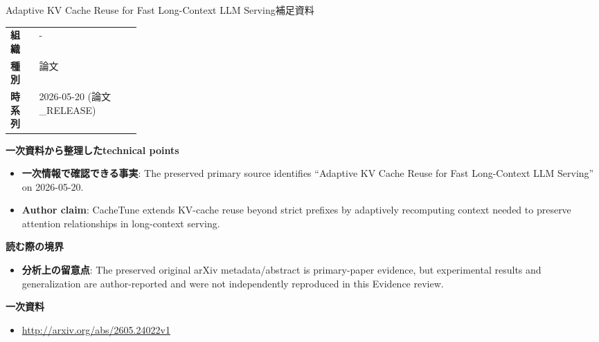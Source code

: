 \begin{technicalnote}{Adaptive KV Cache Reuse for Fast Long-Context LLM Serving}{補足資料}
\begin{tabularx}{\linewidth}{@{}>{\bfseries}p{0.22\linewidth}X@{}}
組織 & - \\
種別 & 論文 \\
時系列 & 2026-05-20 (論文\_RELEASE) \\
\end{tabularx}
\smallskip
{\bfseries 一次資料から整理したtechnical points}
\begin{itemize}[leftmargin=1.5em,itemsep=0.35em]
\item \textbf{一次情報で確認できる事実}: The preserved primary source identifies “Adaptive KV Cache Reuse for Fast Long-Context LLM Serving” on 2026-05-20.
\item \textbf{Author claim}: CacheTune extends KV-cache reuse beyond strict prefixes by adaptively recomputing context needed to preserve attention relationships in long-context serving.
\end{itemize}
{\bfseries 読む際の境界}
\begin{itemize}[leftmargin=1.5em,itemsep=0.35em]
\item \textbf{分析上の留意点}: The preserved original arXiv metadata/abstract is primary-paper evidence, but experimental results and generalization are author-reported and were not independently reproduced in this Evidence review.
\end{itemize}
{\bfseries 一次資料}
\begingroup\sloppy
\begin{itemize}[leftmargin=1.5em,itemsep=0.25em]
\item {\scriptsize\url{http://arxiv.org/abs/2605.24022v1}}
\end{itemize}
\endgroup
\end{technicalnote}
\medskip

